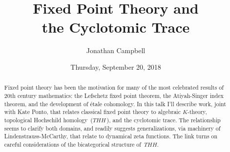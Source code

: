 \documentclass{UAmathtalk}
\author{Jonathan Campbell}
\title{Fixed Point Theory and\\ the Cyclotomic Trace}
\date{Thursday, September 20, 2018}
\begin{document}
\maketitle

\begin{abstract}
Fixed point theory has been the motivation for many of the most celebrated results of 20th century mathematics: the Lefschetz fixed point theorem, the Atiyah-Singer index theorem, and the development of étale cohomology. In this talk I'll describe work, joint with Kate Ponto, that relates classical fixed point theory to algebraic $K$-theory, topological Hochschild homology~($\mathit{THH}\,$), and the cyclotomic trace. The relationship seems to clarify both domains, and readily suggests generalizations, via machinery of Lindenstrauss-McCarthy, that relate to dynamical zeta functions. The link turns on careful considerations of the bicategorical structure of~$\mathit{THH}$.
\end{abstract}
\end{document}
